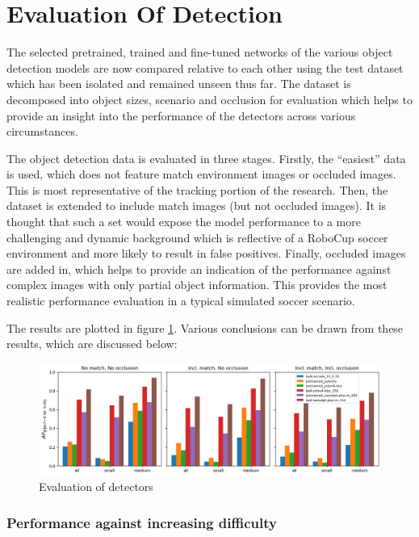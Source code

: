 \documentclass[a4paper,twoside,12pt]{report}
\begin{document}
\section{Evaluation Of Detection}

The selected pretrained, trained and fine-tuned networks of the various object detection models are now compared relative to each other using the test dataset which has been isolated and remained unseen thus far. The dataset is decomposed into object sizes, scenario and occlusion for evaluation which helps to provide an insight into the performance of the detectors across various circumstances. 

The object detection data is evaluated in three stages. Firstly, the ``easiest'' data is used, which does not feature match environment images or occluded images. This is most representative of the tracking portion of the research. Then, the dataset is extended to include match images (but not occluded images). It is thought that such a set would expose the model performance to a more challenging and dynamic background which is reflective of a RoboCup soccer environment and more likely to result in false positives. Finally, occluded images are added in, which helps to provide an indication of the performance against complex images with only partial object information. This provides the most realistic performance evaluation in a typical simulated soccer scenario. 

The results are plotted in figure \ref{fig:evaldetect}. Various conclusions can be drawn from these results, which are discussed below:

\begin{figure}[h!]
\begin{center}
\includegraphics[width=15.5cm]{images/eval_detect.png}
\caption{Evaluation of detectors}
\label{fig:evaldetect}
\end{center}
\end{figure}

\subsubsection{Performance against increasing difficulty}
\end{document}
